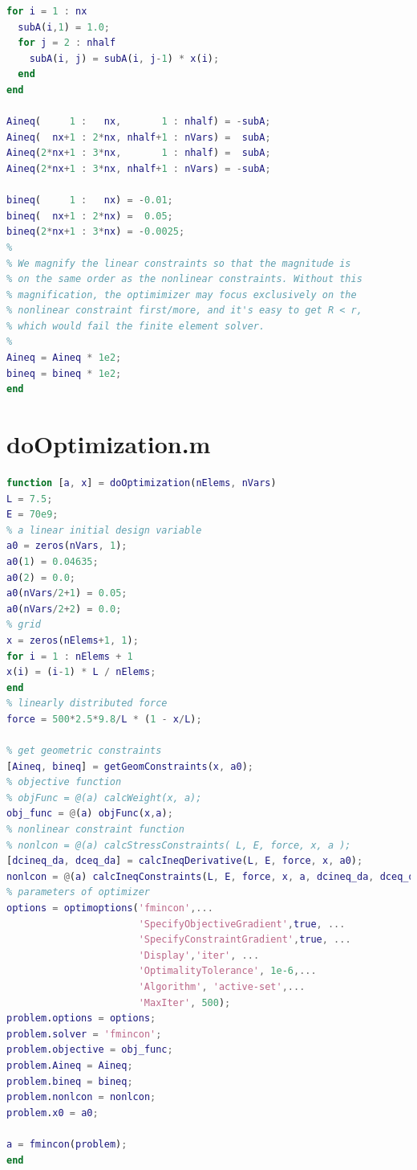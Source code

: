 \documentclass[a4paper]{article}
\begin{document}
\begin{appendices}
\begin{lstlisting}[language=Matlab]
for i = 1 : nx
  subA(i,1) = 1.0;
  for j = 2 : nhalf
    subA(i, j) = subA(i, j-1) * x(i);
  end
end

Aineq(     1 :   nx,       1 : nhalf) = -subA;
Aineq(  nx+1 : 2*nx, nhalf+1 : nVars) =  subA;
Aineq(2*nx+1 : 3*nx,       1 : nhalf) =  subA;
Aineq(2*nx+1 : 3*nx, nhalf+1 : nVars) = -subA;

bineq(     1 :   nx) = -0.01;
bineq(  nx+1 : 2*nx) =  0.05;
bineq(2*nx+1 : 3*nx) = -0.0025;
% 
% We magnify the linear constraints so that the magnitude is
% on the same order as the nonlinear constraints. Without this
% magnification, the optimimizer may focus exclusively on the 
% nonlinear constraint first/more, and it's easy to get R < r, 
% which would fail the finite element solver.
%
Aineq = Aineq * 1e2;
bineq = bineq * 1e2;
end
\end{lstlisting}

\section{doOptimization.m}
\begin{lstlisting}[language=Matlab]
function [a, x] = doOptimization(nElems, nVars)
L = 7.5;
E = 70e9;
% a linear initial design variable
a0 = zeros(nVars, 1);
a0(1) = 0.04635;
a0(2) = 0.0;
a0(nVars/2+1) = 0.05;
a0(nVars/2+2) = 0.0;
% grid
x = zeros(nElems+1, 1);
for i = 1 : nElems + 1
x(i) = (i-1) * L / nElems;
end
% linearly distributed force
force = 500*2.5*9.8/L * (1 - x/L);

% get geometric constraints 
[Aineq, bineq] = getGeomConstraints(x, a0);
% objective function
% objFunc = @(a) calcWeight(x, a);
obj_func = @(a) objFunc(x,a);
% nonlinear constraint function
% nonlcon = @(a) calcStressConstraints( L, E, force, x, a );
[dcineq_da, dceq_da] = calcIneqDerivative(L, E, force, x, a0);
nonlcon = @(a) calcIneqConstraints(L, E, force, x, a, dcineq_da, dceq_da);
% parameters of optimizer
options = optimoptions('fmincon',...
                       'SpecifyObjectiveGradient',true, ...
                       'SpecifyConstraintGradient',true, ...
                       'Display','iter', ...
                       'OptimalityTolerance', 1e-6,...
                       'Algorithm', 'active-set',...
                       'MaxIter', 500);
problem.options = options;
problem.solver = 'fmincon';
problem.objective = obj_func;
problem.Aineq = Aineq;
problem.bineq = bineq;
problem.nonlcon = nonlcon;
problem.x0 = a0;

a = fmincon(problem);
end
\end{lstlisting} 


\end{appendices}
\end{document}
